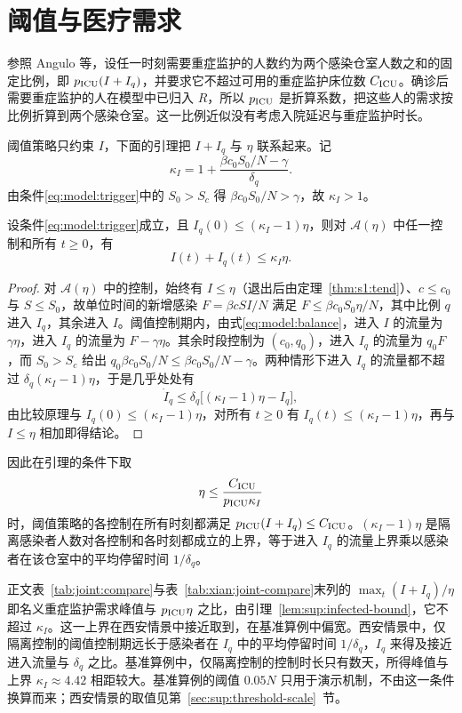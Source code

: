 \section{阈值与医疗需求}
\label{sec:sup:medical-link}
参照 Angulo 等\cite{Angulo2021}，设任一时刻需要重症监护的人数约为两个感染仓室人数之和的固定比例，即 $p_{\rm ICU}(I+I_q)$，并要求它不超过可用的重症监护床位数 $C_{\rm ICU}$。确诊后需要重症监护的人在模型中已归入 $R$，所以 $p_{\rm ICU}$ 是折算系数，把这些人的需求按比例折算到两个感染仓室。这一比例近似没有考虑入院延迟与重症监护时长。

阈值策略只约束 $I$，下面的引理把 $I+I_q$ 与 $\eta$ 联系起来。记
\[
\kappa_I=1+\frac{\beta c_0S_0/N-\gamma}{\delta_q}.
\]
由条件\eqref{eq:model:trigger}中的 $S_0>S_c$ 得 $\beta c_0S_0/N>\gamma$，故 $\kappa_I>1$。

\begin{lemma}
\label{lem:sup:infected-bound}
设条件\eqref{eq:model:trigger}成立，且 $I_q(0)\le(\kappa_I-1)\eta$，则对 $\mathcal A(\eta)$ 中任一控制和所有 $t\ge0$，有
\[
I(t)+I_q(t)\le\kappa_I\eta .
\]
\end{lemma}
\begin{proof}
对 $\mathcal A(\eta)$ 中的控制，始终有 $I\le\eta$（退出后由定理~\ref{thm:s1:tend}）、$c\le c_0$ 与 $S\le S_0$，故单位时间的新增感染 $F=\beta cSI/N$ 满足 $F\le\beta c_0S_0\eta/N$，其中比例 $q$ 进入 $I_q$，其余进入 $I$。阈值控制期内，由式\eqref{eq:model:balance}，进入 $I$ 的流量为 $\gamma\eta$，进入 $I_q$ 的流量为 $F-\gamma\eta$。其余时段控制为 $(c_0,q_0)$，进入 $I_q$ 的流量为 $q_0F$，而 $S_0>S_c$ 给出 $q_0\beta c_0S_0/N\le\beta c_0S_0/N-\gamma$。两种情形下进入 $I_q$ 的流量都不超过 $\delta_q(\kappa_I-1)\eta$，于是几乎处处有
\[
\dot I_q\le\delta_q\bigl[(\kappa_I-1)\eta-I_q\bigr],
\]
由比较原理与 $I_q(0)\le(\kappa_I-1)\eta$，对所有 $t\ge0$ 有 $I_q(t)\le(\kappa_I-1)\eta$，再与 $I\le\eta$ 相加即得结论。
\end{proof}

因此在引理的条件下取
\[
\eta\le\frac{C_{\rm ICU}}{p_{\rm ICU}\kappa_I}
\]
时，阈值策略的各控制在所有时刻都满足 $p_{\rm ICU}(I+I_q)\le C_{\rm ICU}$。$(\kappa_I-1)\eta$ 是隔离感染者人数对各控制和各时刻都成立的上界，等于进入 $I_q$ 的流量上界乘以感染者在该仓室中的平均停留时间 $1/\delta_q$。

正文表~\ref{tab:joint:compare}与表~\ref{tab:xian:joint-compare}末列的 $\max_t(I+I_q)/\eta$ 即名义重症监护需求峰值与 $p_{\rm ICU}\eta$ 之比，由引理~\ref{lem:sup:infected-bound}，它不超过 $\kappa_I$。这一上界在西安情景中接近取到，在基准算例中偏宽。西安情景中，仅隔离控制的阈值控制期远长于感染者在 $I_q$ 中的平均停留时间 $1/\delta_q$，$I_q$ 来得及接近进入流量与 $\delta_q$ 之比。基准算例中，仅隔离控制的控制时长只有数天，所得峰值与上界 $\kappa_I\approx4.42$ 相距较大。基准算例的阈值 $0.05N$ 只用于演示机制，不由这一条件换算而来；西安情景的取值见第~\ref{sec:sup:threshold-scale}~节。
